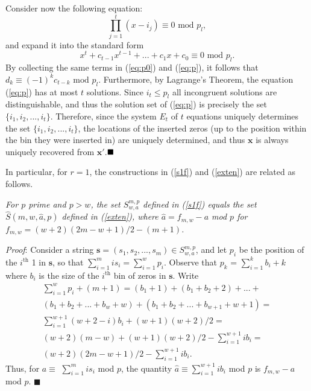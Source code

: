 {Consider now the following equation:
\begin{equation}\label{eq:p0} \prod_{j=1}^t(x-i_j)\equiv 0 \text{ mod } p_l,
\end{equation}
and expand it into the standard form
\begin{equation}\label{eq:p}
x^t+c_{t-1}x^{t-1}+...+c_1x+c_0 \equiv 0 \text{ mod } p_l.
\end{equation}
By collecting the same terms in (\ref{eq:p0}) and (\ref{eq:p}), it
follows that $d_k \equiv (-1)^kc_{t-k} \text{ mod } p_l$.
Furthermore, by Lagrange's Theorem, the equation (\ref{eq:p}) has at
most $t$ solutions. Since $i_t \leq p_l$ all incongruent solutions
are distinguishable, and thus the solution set of (\ref{eq:p}) is
precisely the set $\{i_1,i_2,...,i_t\}$. Therefore, since the system
$E_t$ of $t$ equations uniquely determines the set
$\{i_1,i_2,...,i_t\}$, the locations of the inserted zeros (up to
the position within the bin they were inserted in) are uniquely
determined, and thus $\mathbf{x}$ is always uniquely recovered from
$\mathbf{x'}$.$\hfill\blacksquare$ }

In particular, for $r=1$, the constructions in (\ref{s1f}) and
(\ref{exten}) are related as follows.

\begin{lemma}\textit{For $p$ prime and $p > w$, the set $S_{w,a}^{m,p}$
defined in (\ref{s1f}) equals the set $\hat{S}(m,w,\hat{a},p)$
defined in (\ref{exten}), where $\hat{a}=f_{m,w}-{a}$ mod $p$ for
$f_{m,w}=(w+2)(2m-w+1)/2-(m+1)$.}\end{lemma} \textit{Proof}:
Consider a string $\mathbf{s} =(s_1,s_2,...,s_m)\in S_{w,a}^{m,p}$,
and let $p_i$ be the position of the $i^{\text{th}}$ 1 in
$\mathbf{s}$, so that $\sum_{i=1}^m is_i =\sum_{i=1}^w p_i$. Observe
that $p_k$ = $\sum_{i=1}^k b_i+k$ where $b_i$ is the size of the
$i^{\text{th}}$ bin of zeros in $\mathbf{s}$. Write
\begin{equation}\begin{array}{lll}
\sum_{i=1}^wp_i+(m+1)=
(b_1+1)+(b_1+b_2+2)+...+\\
(b_1+b_2+...+b_w+w)+(b_1+b_2+...+b_{w+1}+w+1)=\\
\sum_{i=1}^{w+1}(w+2-i)b_i+(w+1)(w+2)/2=\\
(w+2)(m-w)+(w+1)(w+2)/2-\sum_{i=1}^{w+1}ib_i=\\
(w+2)(2m-w+1)/2-\sum_{i=1}^{w+1}ib_i.
\end{array}\end{equation}
Thus, for $a \equiv$ $\sum_{i=1}^m is_i$ mod $p$, the quantity
$\hat{a} \equiv \sum_{i=1}^{w+1}ib_i$ mod $p$ is $ f_{m,w}-a$ mod
$p$. \hfill$\blacksquare$

